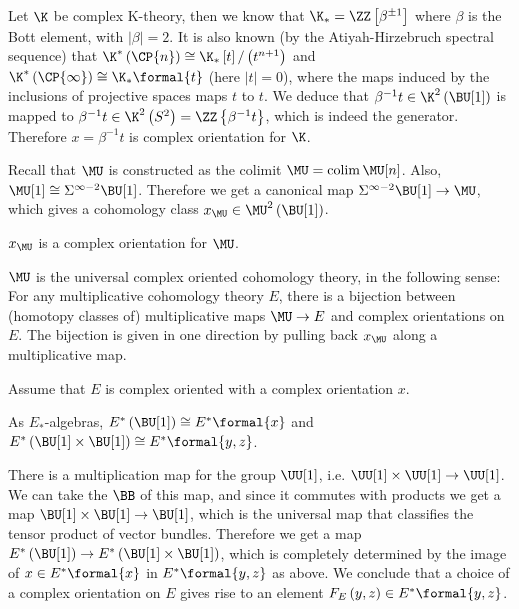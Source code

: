 \begin{example}\label{k-thy-oriented}
	Let $\K$ be complex K-theory, then we know that $\K_* = \ZZ\left[\beta^{\pm 1}\right]$ where $\beta$ is the Bott element, with $\left|\beta\right| = 2$.
	It is also known (by the Atiyah-Hirzebruch spectral sequence) that
	$\K^*\left(\CP{n}\right) \cong \K_* \left[t\right] / \left(t^{n+1}\right)$
	and
	$\K^*\left(\CP{\infty}\right) \cong \K_* \formal{t}$
	(here $\left|t\right| = 0$),
	where the maps induced by the inclusions of projective spaces maps $t$ to $t$.
	We deduce that $\beta^{-1} t \in \K^2\left(\BU[1]\right)$ is mapped to $\beta^{-1} t \in \K^2\left(S^2\right) = \ZZ\left\{\beta^{-1} t\right\}$, which is indeed the generator.
	Therefore $x = \beta^{-1} t$ is complex orientation for $\K$.
\end{example}

\begin{example}
	Recall that $\MU$ is constructed as the colimit $\MU = \colim \MU[n]$.
	Also, $\MU[1] \cong \Sigma^{\infty-2} \BU[1]$.
	Therefore we get a canonical map $\Sigma^{\infty-2} \BU[1] \to \MU$, which gives a cohomology class $x_{\MU} \in \MU^2\left(\BU[1]\right)$.
\end{example}

\begin{proposition}
	$x_{\MU}$ is a complex orientation for $\MU$.
\end{proposition}

\begin{theorem}
	$\MU$ is the universal complex oriented cohomology theory, in the following sense:
	For any multiplicative cohomology theory $E$, there is a bijection between (homotopy classes of) multiplicative maps $\MU \to E$ and complex orientations on $E$.
	The bijection is given in one direction by pulling back $x_{\MU}$ along a multiplicative map.
\end{theorem}

Assume that $E$ is complex oriented with a complex orientation $x$.

\begin{proposition}
	As $E_*$-algebras,
	$E^*\left(\BU[1]\right) \cong E^*\formal{x}$
	and
	$E^*\left(\BU[1] \times \BU[1]\right) \cong E^*\formal{y,z}$.
\end{proposition}

There is a multiplication map for the group $\UU[1]$, i.e. $\UU[1] \times \UU[1] \to \UU[1]$.
We can take the $\BB$ of this map, and since it commutes with products we get a map $\BU[1] \times \BU[1] \to \BU[1]$, which is the universal map that classifies the tensor product of vector bundles.
Therefore we get a map $E^*\left(\BU[1]\right) \to E^*\left(\BU[1] \times \BU[1]\right)$, which is completely determined by the image of $x \in E^*\formal{x}$ in $E^*\formal{y,z}$ as above.
We conclude that a choice of a complex orientation on $E$ gives rise to an element $F_E\left(y,z\right) \in E^*\formal{y,z}$.

